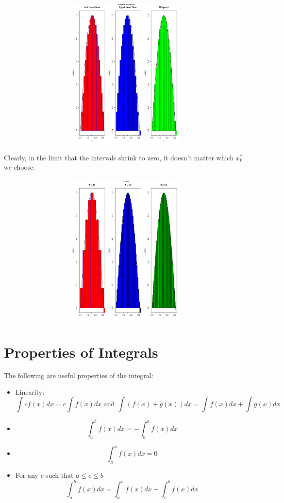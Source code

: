 \documentclass[12pt,a4paper]{article} %
\begin{document}
\includegraphics[width = 6in,height=3in]{RSums.pdf}

Clearly, in the limit that the intervals shrink to zero, it doesn't matter which $x^*_k$ we choose:\\\\

\includegraphics[width = 6in, height=3in]{IntLimit.pdf}
\section{Properties of Integrals}
The following are useful properties of the integral:
\begin{itemize}
\item Linearity:
$$\int cf(x)dx = c\int f(x) dx \textrm{ and } \int(f(x)+g(x))dx = \int f(x)dx + \int g(x) dx$$
\item $$\int_a^b f(x) dx = -\int_b^a f(x) dx$$
\item $$ \int_a^a f(x) dx = 0$$
\item For any $c$ such that $a\leq c\leq b$
$$\int_a^bf(x)dx = \int_a^c f(x) dx + \int_c^b f(x) dx$$ 
\end{itemize}
\end{document}
